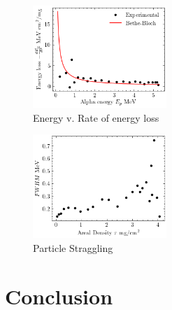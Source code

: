 \documentclass[12pt]{article}
\begin{document}
\begin{multicols}{2}
    \begin{figure}[H]
        \includegraphics[width=0.45\textwidth]{charts/EnergyLoss.png}
        \caption{Energy v. Rate of energy loss}
        \label{energyloss}
    \end{figure}

    \begin{figure}[H]
        \includegraphics[width=0.45\textwidth]{charts/FWHM.png}
        \caption{Particle Straggling}
        \label{fwhm}
    \end{figure}

    \section{Conclusion}

    
    
\end{multicols}
\end{document}
